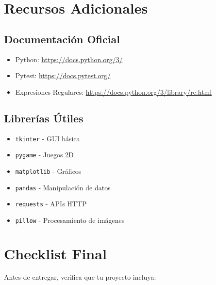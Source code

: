 \documentclass[12pt,a4paper]{article}
\begin{document}
\section{Recursos Adicionales}

\subsection{Documentación Oficial}
\begin{itemize}
    \item Python: \url{https://docs.python.org/3/}
    \item Pytest: \url{https://docs.pytest.org/}
    \item Expresiones Regulares: \url{https://docs.python.org/3/library/re.html}
\end{itemize}

\subsection{Librerías Útiles}
\begin{itemize}
    \item \texttt{tkinter} - GUI básica
    \item \texttt{pygame} - Juegos 2D
    \item \texttt{matplotlib} - Gráficos
    \item \texttt{pandas} - Manipulación de datos
    \item \texttt{requests} - APIs HTTP
    \item \texttt{pillow} - Procesamiento de imágenes
\end{itemize}

\section{Checklist Final}

Antes de entregar, verifica que tu proyecto incluya:
\end{document}
